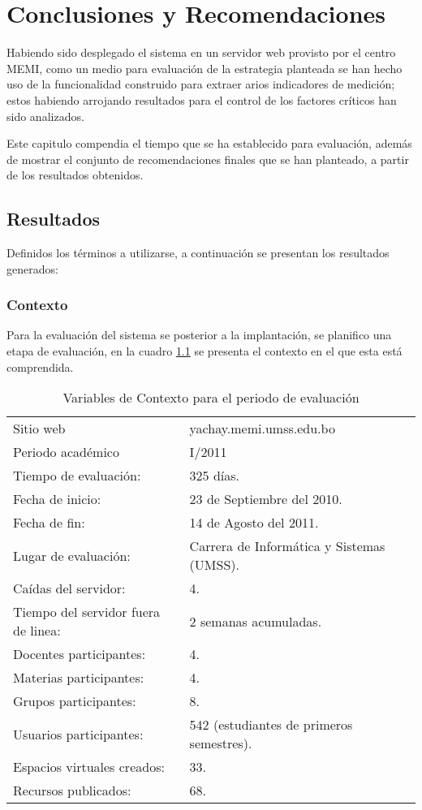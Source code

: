 \chapter{Conclusiones y Recomendaciones}

Habiendo sido desplegado el sistema en un servidor web provisto por el centro
MEMI, como un medio para evaluación de la estrategia planteada se han hecho uso
de la funcionalidad construido para extraer arios indicadores de medición; estos
habiendo arrojando resultados para el control de los factores críticos han sido
analizados.

Este capitulo compendia el tiempo que se ha establecido para evaluación, además
de mostrar el conjunto de recomendaciones finales que se han planteado, a partir
de los resultados obtenidos.

\section{Resultados}

Definidos los términos a utilizarse, a continuación se presentan los resultados
generados:

\subsection{Contexto}
Para la evaluación del sistema se posterior a la implantación, se planifico una
etapa de evaluación, en la cuadro \ref{contexto} se presenta el contexto en el
que esta está comprendida.

\begin{table}
\centering
\begin{tabular}{|l|l|}
\hline
Sitio web & yachay.memi.umss.edu.bo \\
Periodo académico & I/2011 \\
Tiempo de evaluación: & 325 días. \\
Fecha de inicio: & 23 de Septiembre del 2010. \\
Fecha de fin: & 14 de Agosto del 2011. \\
Lugar de evaluación: & Carrera de Informática y Sistemas (UMSS). \\
Caídas del servidor: & 4. \\
Tiempo del servidor fuera de linea: & 2 semanas acumuladas. \\
Docentes participantes: & 4. \\
Materias participantes: & 4. \\
Grupos participantes: & 8. \\
Usuarios participantes: & 542 (estudiantes de primeros semestres). \\
Espacios virtuales creados: & 33. \\
Recursos publicados: & 68. \\
\hline
\end{tabular}
\caption{Variables de Contexto para el periodo de evaluación}
\label{contexto}
\end{table}

